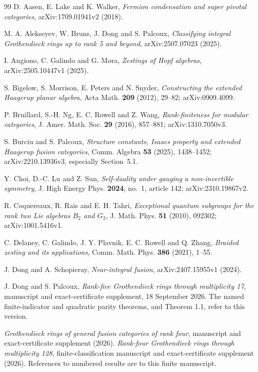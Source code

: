 \begin{thebibliography}{99}
\setlength{\itemsep}{2pt}
D. Aasen, E. Lake and K. Walker, \emph{Fermion condensation and super pivotal categories}, arXiv:1709.01941v2 (2018).

M. A. Alekseyev, W. Bruns, J. Dong and S. Palcoux, \emph{Classifying integral Grothendieck rings up to rank 5 and beyond}, arXiv:2507.07023 (2025).

I. Angiono, C. Galindo and G. Mora, \emph{Zestings of Hopf algebras}, arXiv:2505.10447v1 (2025).

S. Bigelow, S. Morrison, E. Peters and N. Snyder,
\emph{Constructing the extended Haagerup planar algebra}, Acta Math.
\textbf{209} (2012), 29--82; arXiv:0909.4099.

P. Bruillard, S.-H. Ng, E. C. Rowell and Z. Wang, \emph{Rank-finiteness for modular categories}, J. Amer. Math. Soc. \textbf{29} (2016), 857--881; arXiv:1310.7050v3.

S. Burciu and S. Palcoux,
\emph{Structure constants, Isaacs property and extended Haagerup fusion categories},
Comm. Algebra \textbf{53} (2025), 1438--1452; arXiv:2210.13936v3,
especially Section~5.1.

Y. Choi, D.-C. Lu and Z. Sun, \emph{Self-duality under gauging a non-invertible symmetry}, J. High Energy Phys. \textbf{2024}, no.~1, article 142; arXiv:2310.19867v2.

R. Coquereaux, R. Rais and E. H. Tahri, \emph{Exceptional quantum subgroups for the rank two Lie algebras $B_2$ and $G_2$}, J. Math. Phys. \textbf{51} (2010), 092302; arXiv:1001.5416v1.

C. Delaney, C. Galindo, J. Y. Plavnik, E. C. Rowell and Q. Zhang, \emph{Braided zesting and its applications}, Comm. Math. Phys. \textbf{386} (2021), 1--55.

J. Dong and A. Schopieray, \emph{Near-integral fusion}, arXiv:2407.15955v1 (2024).

J. Dong and S. Palcoux, \emph{Rank-five Grothendieck rings through multiplicity 17}, manuscript and exact-certificate supplement, 18 September 2026. The named finite-indicator and quadratic parity theorems, and Theorem 1.1, refer to this version.

 \emph{Grothendieck rings of general fusion categories of rank four}, manuscript and exact-certificate supplement (2026).
 \emph{Rank-four Grothendieck rings through multiplicity 128}, finite-classification manuscript and exact-certificate supplement (2026). References to numbered results are to this finite manuscript.


\end{thebibliography}
